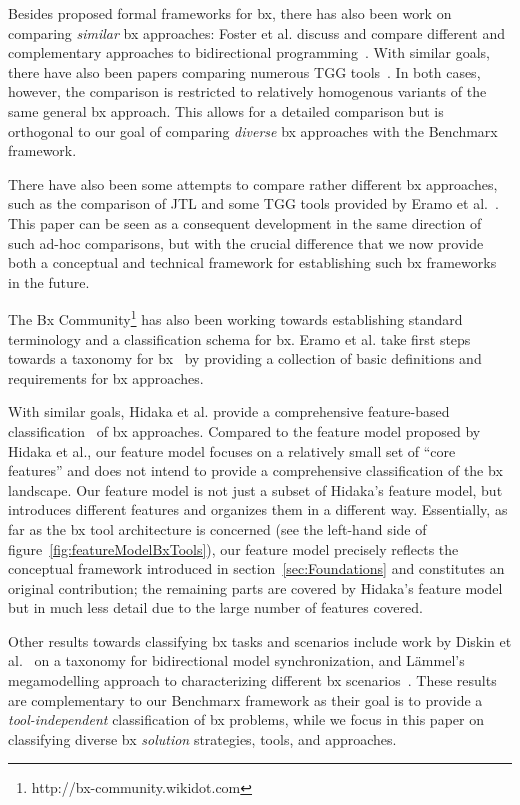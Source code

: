 Besides proposed formal frameworks for bx, there has also been work on comparing \emph{similar} bx approaches:  Foster et al. discuss and compare different and complementary approaches to bidirectional programming~\cite{DBLP:conf/ssgip/FosterMV10}.
With similar goals, there have also been papers comparing numerous TGG tools~\cite{DBLP:journals/eceasst/HildebrandtLGRGSLAS13,DBLP:journals/eceasst/LeblebiciASHRG14}.
In both cases, however, the comparison is restricted to relatively homogenous variants of the same general bx approach.
This allows for a detailed comparison but is orthogonal to our goal of comparing \emph{diverse} bx approaches with the Benchmarx framework.

There have also been some attempts to compare rather different bx approaches, such as the comparison of JTL and some TGG tools provided by Eramo et al.~\cite{DBLP:journals/eceasst/EramoB13}.
This paper can be seen as a consequent development in the same direction of such ad-hoc comparisons, but with the crucial difference that we now provide both a conceptual and technical framework for establishing such bx frameworks in the future.  

The Bx Community\footnote{http://bx-community.wikidot.com} has also been working towards establishing standard terminology and a classification schema for bx.
Eramo et al. take first steps towards a taxonomy for bx~\cite{DBLP:conf/sattose/EramoMP14} by providing a collection of basic definitions and requirements for bx approaches.

With similar goals, Hidaka et al. provide a comprehensive feature-based classification~\cite{SOSYM-Hidaka2016} of bx approaches.
Compared to the feature model proposed by Hidaka et al., our feature model focuses on a relatively small set of ``core features'' and does not intend to provide a comprehensive classification of the bx landscape.
Our feature model is not just a subset of Hidaka's feature model, but introduces different features and organizes them in a different way.
Essentially, as far as the bx tool architecture is concerned (see the left-hand side of figure~\ref{fig:featureModelBxTools}), our feature model precisely reflects the conceptual framework introduced in section~\ref{sec:Foundations} and constitutes an original contribution; the remaining parts are covered by Hidaka's feature model but in much less detail due to the large number of features covered.

Other results towards classifying bx tasks and scenarios include work by Diskin et al.~\cite{DBLP:journals/jss/DiskinGWC16} on a taxonomy for bidirectional model synchronization, and Lämmel's megamodelling approach to characterizing different bx scenarios~\cite{DBLP:conf/sle/Lammel16}.
These results are complementary to our Benchmarx framework as their goal is to provide a \emph{tool-independent} classification of bx problems, while we focus in this paper on classifying diverse bx \emph{solution} strategies, tools, and approaches.   

